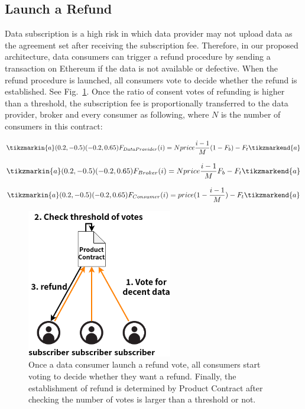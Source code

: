 \begin{spacing}{2.0}
\subsection{Launch a Refund}
\label{section:refund}
Data subscription is a high risk in which data provider may not upload data as the agreement set after receiving the subscription fee. Therefore, in our proposed architecture, data consumers can trigger a refund procedure by sending a transaction on Ethereum if the data is not available or defective. When the refund procedure is launched, all consumers vote to decide whether the refund is established. See Fig.~\ref{fig:refund}. Once the ratio of consent votes of refunding is higher than a threshold, the subscription fee is proportionally transferred to the data provider, broker and every consumer as following, where $N$ is the number of consumers in this contract:

\begin{equation}\tikzmarkin{a}(0.2,-0.5)(-0.2,0.65)
    F_{DataProvider}(i) = Nprice \frac{i-1}{M} (1-F_{b}) -F_{t}
    \tikzmarkend{a}
\end{equation}

\begin{equation}\tikzmarkin{a}(0.2,-0.5)(-0.2,0.65)
    F_{Broker}(i) = Nprice \frac{i-1}{M} F_{b} -F_{t}
    \tikzmarkend{a}
\end{equation}

\begin{equation}\tikzmarkin{a}(0.2,-0.5)(-0.2,0.65)
    F_{Consumer}(i) = price (1-\frac{i-1}{M}) -F_{t}
    \tikzmarkend{a}
\end{equation}

\begin{figure}[h]
    \centering
    \includegraphics[width=2.5in]{img/refund}
    \caption{Once a data consumer launch a refund vote, all consumers start voting to decide whether they want a refund. Finally, the establishment of refund is determined by Product Contract after checking the number of votes is larger than a threshold or not.}
    \label{fig:refund}
\end{figure}


\end{spacing}
